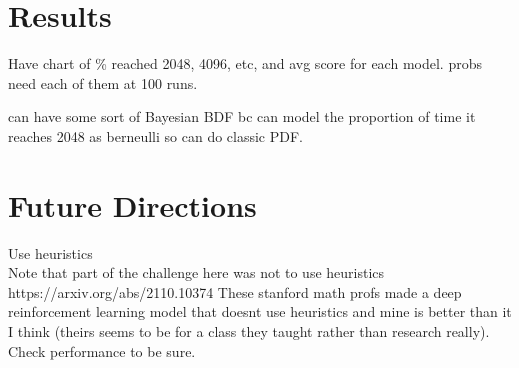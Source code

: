 \documentclass{article}
\begin{document}
\section{Results}
Have chart of \% reached 2048, 4096, etc, and avg score for each model. probs need each of them at 100 runs.

can have some sort of Bayesian BDF bc can model the proportion of time it reaches 2048 as berneulli so can do classic PDF.

\section{Future Directions}
Use heuristics\\
Note that part of the challenge here was not to use heuristics
https://arxiv.org/abs/2110.10374
These stanford math profs made a deep reinforcement learning model that doesnt use heuristics and mine is better than it I think (theirs seems to be for a class they taught rather than research really). Check performance to be sure.
\end{document}
